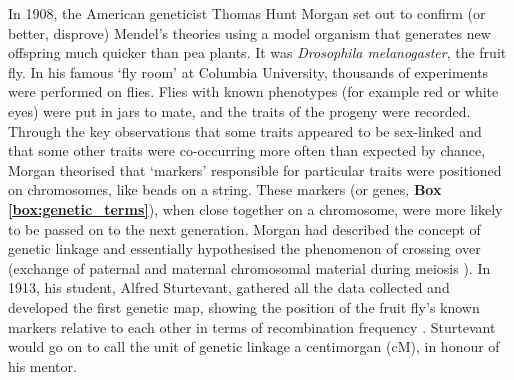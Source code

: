 In 1908, the American geneticist Thomas Hunt Morgan set out to confirm (or better, disprove) Mendel’s theories using a model organism that generates new offspring much quicker than pea plants. 
It was \textit{Drosophila melanogaster}, the fruit fly. 
In his famous `fly room' at Columbia University, thousands of experiments were performed on flies. 
Flies with known phenotypes (for example red or white eyes) were put in jars to mate, and the traits of the progeny were recorded. 
Through the key observations that some traits appeared to be sex-linked and that some other traits were co-occurring more often than expected by chance, Morgan theorised that `markers' responsible for particular traits were positioned on chromosomes, like beads on a string. 
These markers (or genes, \textbf{Box \ref{box:genetic_terms}}), when close together on a chromosome, were more likely to be passed on to the next generation. 
Morgan had described the concept of genetic linkage and essentially hypothesised the phenomenon of crossing over (exchange of paternal and maternal chromosomal material during meiosis \cite{morgan1911random}). 
In 1913, his student, Alfred Sturtevant, gathered all the data collected and developed the first genetic map, showing the position of the fruit fly’s known markers relative to each other in terms of recombination frequency \cite{sturtevant1913linear}. 
Sturtevant would go on to call the unit of genetic linkage a centimorgan (cM), in honour of his mentor.\\



